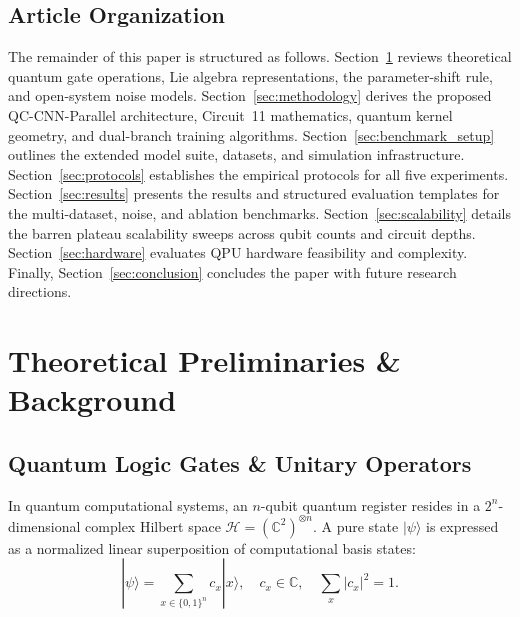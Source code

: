 \documentclass[journal]{IEEEtran}
\begin{document}
\subsection{Article Organization}
The remainder of this paper is structured as follows. Section~\ref{sec:preliminaries} reviews theoretical quantum gate operations, Lie algebra representations, the parameter-shift rule, and open-system noise models. Section~\ref{sec:methodology} derives the proposed QC-CNN-Parallel architecture, Circuit~11 mathematics, quantum kernel geometry, and dual-branch training algorithms. Section~\ref{sec:benchmark_setup} outlines the extended model suite, datasets, and simulation infrastructure. Section~\ref{sec:protocols} establishes the empirical protocols for all five experiments. Section~\ref{sec:results} presents the results and structured evaluation templates for the multi-dataset, noise, and ablation benchmarks. Section~\ref{sec:scalability} details the barren plateau scalability sweeps across qubit counts and circuit depths. Section~\ref{sec:hardware} evaluates QPU hardware feasibility and complexity. Finally, Section~\ref{sec:conclusion} concludes the paper with future research directions.

\section{Theoretical Preliminaries \& Background}
\label{sec:preliminaries}

\subsection{Quantum Logic Gates \& Unitary Operators}
In quantum computational systems, an $n$-qubit quantum register resides in a $2^n$-dimensional complex Hilbert space $\mathcal{H} = (\mathbb{C}^2)^{\otimes n}$. A pure state $|\psi\rangle$ is expressed as a normalized linear superposition of computational basis states:
\begin{equation}
|\psi\rangle = \sum_{x \in \{0,1\}^n} c_x |x\rangle, \quad c_x \in \mathbb{C}, \quad \sum_{x} |c_x|^2 = 1.
\label{eq:state_superposition}
\end{equation}
\end{document}
